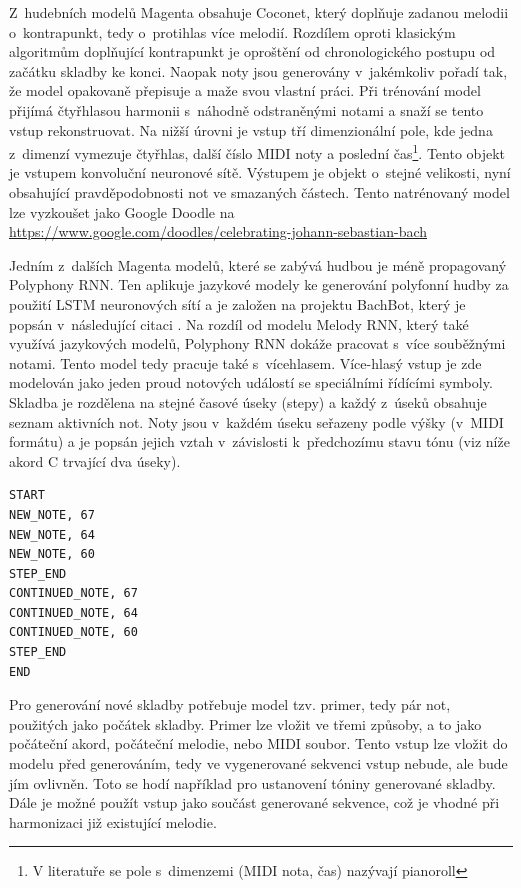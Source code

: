 Z~hudebních modelů Magenta obsahuje Coconet, 
který doplňuje zadanou melodii o~kontrapunkt, 
tedy o~protihlas více melodií\cite{kofron, huang2017counterpoint}.
Rozdílem oproti klasickým algoritmům doplňující kontrapunkt
je oproštění od chronologického postupu od začátku skladby ke konci.
Naopak noty jsou generovány v~jakémkoliv pořadí tak, 
že model opakovaně přepisuje a maže svou vlastní práci.
Při trénování model přijímá čtyřhlasou harmonii s~náhodně odstraněnými notami a snaží se tento vstup rekonstruovat.
Na nižší úrovni je vstup tří dimenzionální pole, 
kde jedna z~dimenzí vymezuje čtyřhlas, další číslo MIDI noty a poslední čas\footnote{V literatuře se pole s~dimenzemi (MIDI nota, čas) nazývají pianoroll}.
Tento objekt je vstupem konvoluční neuronové sítě.  
Výstupem je objekt o~stejné velikosti, 
nyní obsahující pravděpodobnosti not ve smazaných částech.
\cite{huang2017counterpoint}
Tento natrénovaný model lze vyzkoušet jako Google Doodle na \url{https://www.google.com/doodles/celebrating-johann-sebastian-bach}
\par
Jedním z~dalších Magenta modelů, které se zabývá hudbou je méně propagovaný Polyphony RNN. 
Ten aplikuje jazykové modely ke generování polyfonní hudby za použití LSTM neuronových sítí
a je založen na projektu BachBot, který je popsán v~následující citaci \cite{Liang_AutomaticComposition}.
Na rozdíl od modelu Melody RNN, který také využívá jazykových modelů, 
Polyphony RNN dokáže pracovat s~více souběžnými notami.
Tento model tedy pracuje také s~vícehlasem.
Více-hlasý vstup je zde modelován jako jeden proud notových událostí se speciálními řídícími symboly.
Skladba je rozdělena na stejné časové úseky (stepy) 
a každý z~úseků obsahuje seznam aktivních not.
Noty jsou v~každém úseku seřazeny podle výšky (v~MIDI formátu) 
a je popsán jejich vztah v~závislosti k~předchozímu stavu tónu (viz níže akord C trvající dva úseky).
\cite{google_git_polyphony}
\begin{verbatim}
START
NEW_NOTE, 67
NEW_NOTE, 64
NEW_NOTE, 60
STEP_END
CONTINUED_NOTE, 67
CONTINUED_NOTE, 64
CONTINUED_NOTE, 60
STEP_END
END
\end{verbatim}
Pro generování nové skladby potřebuje model tzv. primer, tedy pár not, 
použitých jako počátek skladby. 
Primer lze vložit ve třemi způsoby, a to jako počáteční akord,
počáteční melodie, nebo MIDI soubor.
Tento vstup lze vložit do modelu před generováním,
tedy ve vygenerované sekvenci vstup nebude, ale bude jím ovlivněn.
Toto se hodí například pro ustanovení tóniny generované skladby.
Dále je možné použít vstup jako součást generované sekvence,
což je vhodné při harmonizaci již existující melodie.
\cite{google_git_polyphony}

